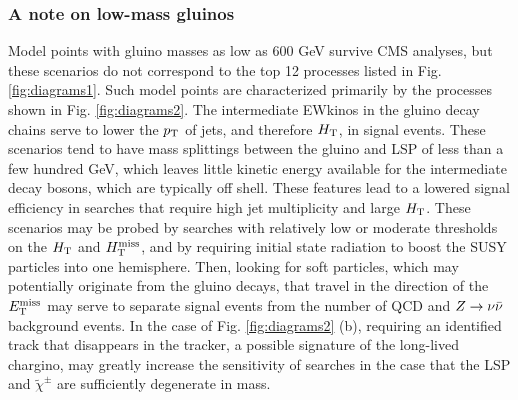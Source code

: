 \subsubsection{A note on low-mass gluinos}
Model points with gluino masses as low as 600 GeV survive CMS analyses, but these scenarios do not correspond to the top 12 processes listed in Fig. \ref{fig:diagrams1}. Such model points are characterized primarily by the processes shown in Fig. \ref{fig:diagrams2}. The intermediate EWkinos in the gluino decay chains serve to lower the $p_{\text{T}}$ of jets, and therefore $H_{\rm T}$, in signal events. These scenarios tend to have mass splittings between the gluino and LSP of less than a few hundred GeV, which leaves little kinetic energy available for the intermediate decay bosons, which are typically off shell. These features lead to a lowered signal efficiency in searches that require high jet multiplicity and large $H_{\rm T}$. These scenarios may be probed by searches with relatively low or moderate thresholds on the $H_{\rm T}$ and $H_{\text{T}}^{\rm miss}$, and by requiring initial state radiation to boost the SUSY particles into one hemisphere. Then, looking for soft particles, which may potentially originate from the gluino decays, that travel in the direction of the $E_{\text{T}}^{\rm miss}$ may serve to separate signal events from the number of QCD and $Z\rightarrow \nu\bar{\nu}$ background events. In the case of Fig. \ref{fig:diagrams2} (b), requiring an identified track that disappears in the tracker,  a possible signature of the long-lived chargino, may greatly increase the sensitivity of searches in the case that the LSP and $\tilde{\chi}^{\pm}$ are sufficiently degenerate in mass.
